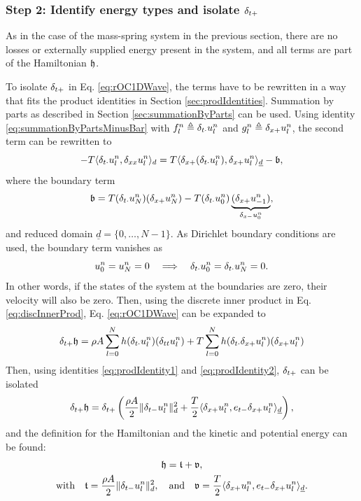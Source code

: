 {{\subsubsection{Step 2: Identify energy types and isolate $\delta_{t+}$}
As in the case of the mass-spring system in the previous section, there are no losses or externally supplied energy present in the system, and all terms are part of the Hamiltonian $\mathfrak{h}$.

To isolate $\delta_{t+}$ in Eq. \eqref{eq:rOC1DWave}, the terms have to be rewritten in a way that fits the product identities in Section \ref{sec:prodIdentities}.
Summation by parts as described in Section \ref{sec:summationByParts}  can be used. Using identity \eqref{eq:summationByPartsMinusBar}  with $f_l^n \triangleq \delta_{t\cdot} u_l^n$ and $g_l^n \triangleq \delta_{x+} u_l^n$, the second term can be rewritten to 
%
\begin{equation*}
    - T \langle \delta_{t\cdot}u_l^n, \delta_{xx} u_l^n\rangle_d  = T\langle \delta_{x+}(\delta_{t\cdot}u_l^n), \delta_{x+}u_l^n\rangle_{\underline{d}} - \mathfrak{b},
\end{equation*}
where the boundary term
\begin{equation*}
    \mathfrak{b} = T(\delta_{t\cdot} u_N^n)(\delta_{x+} u_N^n) - T(\delta_{t\cdot} u_0^n) \underbrace{(\delta_{x+} u_{-1}^n)}_{\delta_{x-} u_0^n},
\end{equation*}
and reduced domain $\underline{d} = \{0, \hdots, N-1\}$. As Dirichlet boundary conditions are used, the boundary term vanishes as 
\begin{equation*}
    u_0^n = u_N^n = 0 \quad \Longrightarrow \quad \delta_{t\cdot} u_0^n = \delta_{t\cdot} u_N^n = 0.
\end{equation*}
In other words, if the states of the system at the boundaries are zero, their velocity will also be zero. 
Then, using the discrete inner product in Eq. \eqref{eq:discInnerProd}, Eq. \eqref{eq:rOC1DWave} can be expanded to
\begin{equation}
    \delta_{t+} \mathfrak{h} = \rho A \sum_{l = 0}^N h(\delta_{t\cdot} u_l^n)(\delta_{tt} u_l^n) + T \sum_{l = 0}^N h(\delta_{t\cdot} \delta_{x+} u_l^n)(\delta_{x+} u_l^n)
\end{equation}
Then, using identities \eqref{eq:prodIdentity1} and \eqref{eq:prodIdentity2}, $\delta_{t+}$ can be isolated 
\begin{equation}
    \delta_{t+} \mathfrak{h} = \delta_{t+} \left(\frac{\rho A}{2}\lVert\delta_{t-} u_l^n\rVert^2_d + \frac{T}{2}\langle\delta_{x+}u_l^n, e_{t-}\delta_{x+}u_l^n\rangle_{\underline{d}}\right),
\end{equation}
and the definition for the Hamiltonian and the kinetic and potential energy can be found:
\begin{equation}\label{eq:energyBalance1DWave}
    \begin{gathered}
        \mathfrak{h} = \mathfrak{t} + \mathfrak{v},\\
        \text{with}\quad \mathfrak{t} = \frac{\rho A}{2}\lVert\delta_{t-} u_l^n\rVert^2_d, \quad \text{and} \quad \mathfrak{v} = \frac{T}{2}\langle\delta_{x+}u_l^n, e_{t-}\delta_{x+}u_l^n\rangle_{\underline{d}}.
    \end{gathered}
\end{equation}

}}
